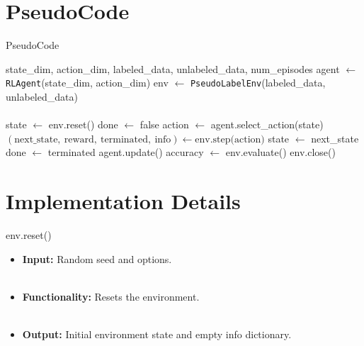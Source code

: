\documentclass{beamer}
\begin{document}
\section{PseudoCode}
\begin{frame}{PseudoCode}
  \begin{algorithm}[H]
    \caption{RL agent training loop}
    \label{alg:rl_training_algpseudocode}
    \scriptsize
    \begin{algorithmic}
      \Require state\_dim, action\_dim, labeled\_data, unlabeled\_data, num\_episodes
      \State agent $\leftarrow$ \texttt{RLAgent}(state\_dim, action\_dim)
      \State env $\leftarrow$ \texttt{PseudoLabelEnv}(labeled\_data, unlabeled\_data) \\~\\
      \State state $\leftarrow$ env.reset()
      \State done $\leftarrow$ false
      \State action $\leftarrow$ agent.select\_action(state)
      \State $(\text{next\_state},\ \text{reward},\ \text{terminated},\ \text{info}) \leftarrow \text{env.step(action)}$
      \State state $\leftarrow$ next\_state
      \State done $\leftarrow$ terminated
      \EndWhile
      \State agent.update()
      \State accuracy $\leftarrow$ env.evaluate()
      \EndFor
      \State env.close()
    \end{algorithmic}
  \end{algorithm}
\end{frame}


\section{Implementation Details}

\begin{frame}[fragile]{env.reset()}
  \begin{itemize}
       \\~\\
    \item \textbf{Input:} Random seed and options. \\~\\
    \item \textbf{Functionality:} Resets the environment. \\~\\ %
      \begin{itemize}
      \end{itemize}
    \item \textbf{Output:} Initial environment state and empty info dictionary.
  \end{itemize}
\end{frame}
\end{document}
